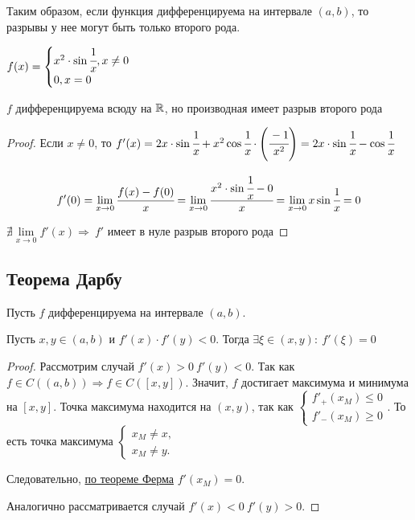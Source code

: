 Таким образом, если функция дифференцируема на интервале $(a,b)$, то разрывы у нее могут быть только второго рода. 

\begin{example}
	$f(x) = \begin{cases}
		x^2 \cdot \sin \cfrac{1}{x}, x\neq 0 \\
		0, x = 0 \hfill
	\end{cases}$
	
	$f$ дифференцируема всюду на $\mathbb{R}$, но производная имеет разрыв второго рода
\end{example}
\begin{proof}
	Если $x\neq 0$, то $f'(x) = 2x \cdot\sin \cfrac{1}{x} + x^{2} \cos \cfrac{1}{x} \cdot \left(\cfrac{-1}{x^2}\right) = 2x\cdot\sin \cfrac{1}{x} - \cos \cfrac{1}{x} $
	
	$$f'(0) = \lim\limits_{x\to 0} \cfrac{f(x) - f(0)}{x} = \lim\limits_{x\to 0} \cfrac{x^2\cdot \sin \cfrac{1}{x} - 0}{x} =  \lim\limits_{x\to 0} x \sin \cfrac{1}{x} = 0$$
	
	$\nexists \lim\limits_{x\to 0} f'(x) \Rightarrow \ f'$ имеет в нуле разрыв второго рода 
\end{proof}

\subsection{Теорема Дарбу}

\begin{lemma}
	Пусть $f$ дифференцируема на интервале $(a, b)$. 
	
	Пусть $x, y \in (a, b)$ и $f'(x) \cdot f'(y) < 0$. Тогда $\exists \xi \in (x, y):\  f'(\xi) = 0$
\end{lemma}
\begin{proof}
	Рассмотрим случай $f'(x) > 0 \ f'(y) < 0$. Так как $f \in C((a, b)) \Rightarrow f \in C([x,y])$. Значит, $ f$ достигает максимума и минимума на $[x,y].$ Точка максимума находится на $(x,y)$, так как $\begin{cases}
		f'_{+}(x_{M}) \leq 0\\
		f'_{-}(x_{M}) \geq 0
	\end{cases}$. То есть точка максимума $\begin{cases}
	x_{M} \neq x,\\
	x_{M} \neq y.
	\end{cases}$
	
	Следовательно, \hyperlink{thrm5.9}{по теореме Ферма} $f'(x_{M}) = 0.$
	
	Аналогично рассматривается случай $f'(x) < 0 \ f'(y) > 0$.
\end{proof}

